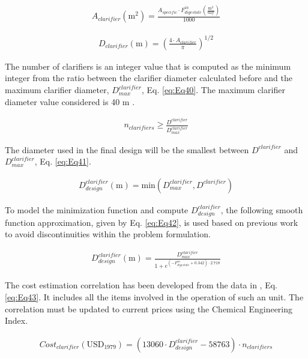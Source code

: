 \begin{refsection}[referencesCh2]
\begin{align}
	{A}_{clarifier} \left( \text{m}^2 \right) = \frac{A_{specific} \cdot F_{digestate}^{in}\left( \frac{\text{m}^3}{\text{day}} \right)}{1000} \label{eq:Eq38}
\end{align}

\begin{align}
	D_{clarifier} \left( \text{m} \right) = \left( \frac{4 \cdot A_{clarifier}}{\pi} \right)^{1/2} \label{eq:Eq39}
\end{align}

The number of clarifiers is an integer value that is computed as the minimum integer from the ratio between the clarifier diameter calculated before and the maximum clarifier diameter, $D_{max}^{clarifier}$, Eq. \ref{eq:Eq40}. The maximum clarifier diameter value considered is 40 m \citep{green2008perry}.

\begin{align}
	{n}_{clarifiers} \ge \frac{D^{clarifier}}{D_{max}^{clarifier}} \label{eq:Eq40}
\end{align}

The diameter used in the final design will be the smallest between $D^{clarifier}$ and $D_{max}^{clarifier}$, Eq. \ref{eq:Eq41}.

\begin{align}
	D_{design}^{clarifier} \left( \text{m} \right) = \text{min}(D_{max}^{clarifier},D^{clarifier}) \label{eq:Eq41}
\end{align}

To model the minimization function and compute $D_{design}^{clarifier}$, the following smooth function approximation, given by Eq. \ref{eq:Eq42}, is used based on previous work \citep{de2016characterization} to avoid discontinuities within the problem formulation.

\begin{align}
	D_{design}^{clarifier} \left( \text{m} \right) = \frac{D_{max}^{clarifier}}{1 + {e^{\left( -F_{digestate}^{in} + 0.342 \right) \cdot 2.718}}} \label{eq:Eq42}
\end{align}

The cost estimation correlation has been developed from the data in \citet{wef2005wef}, Eq. \ref{eq:Eq43}. It includes all the items involved in the operation of such an unit. The correlation must be updated to current prices using the Chemical Engineering Index.

\begin{align}
	Cost_{clarifier} \left( \text{USD}_{1979} \right) = \left( 13060 \cdot D_{design}^{clarifier} - 58763 \right) \cdot {n}_{clarifiers} \label{eq:Eq43}
\end{align}


\end{refsection}
